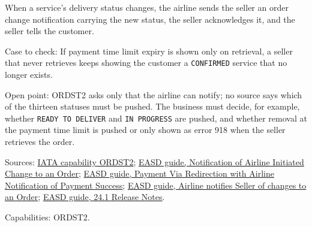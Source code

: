 \begin{theorem}
  \label{thm:delivery-seller-told}
  \notready
  When a service's delivery status changes, the airline sends the seller an
  order change notification carrying the new status, the seller acknowledges
  it, and the seller tells the customer.

  Case to check: If payment time limit expiry is shown only on retrieval, a
  seller that never retrieves keeps showing the customer a
  \texttt{CONFIRMED} service that no longer exists.

  Open point: ORDST2 asks only that the airline can notify; no source says
  which of the thirteen statuses must be pushed. The business must decide,
  for example, whether \texttt{READY TO DELIVER} and \texttt{IN PROGRESS}
  are pushed, and whether removal at the payment time limit is pushed or
  only shown as error 918 when the seller retrieves the order.

  Sources: \href{https://retailing.iata.org/armi/docs/ORDST2/}{IATA capability ORDST2};
  \href{https://standards.atlassian.net/wiki/spaces/EASD/pages/574455903}{EASD guide, Notification of Airline Initiated Change to an Order};
  \href{https://standards.atlassian.net/wiki/spaces/EASD/pages/670203914}{EASD guide, Payment Via Redirection with Airline Notification of Payment Success​};
  \href{https://standards.atlassian.net/wiki/spaces/EASD/pages/815202352}{EASD guide, Airline notifies Seller of changes to an Order};
  \href{https://standards.atlassian.net/wiki/spaces/EASD/pages/1404665857}{EASD guide, 24.1 Release Notes}.

  Capabilities: ORDST2.
\end{theorem}

